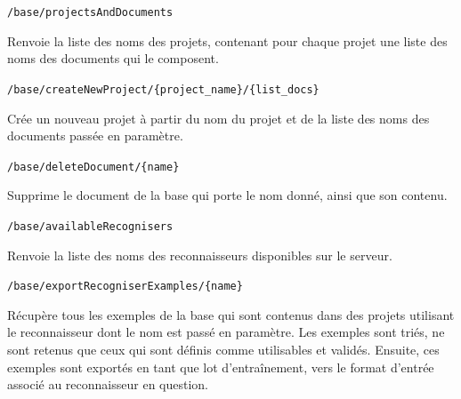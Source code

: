 \begin{description}[align=left]

\item [Général]

\item [GET] \texttt{/base/projectsAndDocuments}\newline{}
\begin{itshape}
Renvoie la liste des noms des projets, contenant pour chaque projet une liste des noms des documents qui le composent.
\end{itshape}

\item [POST] \texttt{/base/createNewProject/\{project\_name\}/\{list\_docs\}}\newline{}
\begin{itshape}
Crée un nouveau projet à partir du nom du projet et de la liste des noms des documents passée en paramètre.
\end{itshape}

\item [DELETE] \texttt{/base/deleteDocument/\{name\}}\newline{}
\begin{itshape}
Supprime le document de la base qui porte le nom donné, ainsi que son contenu.
\end{itshape}

\item [GET] \texttt{/base/availableRecognisers}\newline{}
\begin{itshape}
Renvoie la liste des noms des reconnaisseurs disponibles sur le serveur.
\end{itshape}

\item [POST] \texttt{/base/exportRecogniserExamples/\{name\}}\newline{}
\begin{itshape}
Récupère tous les exemples de la base qui sont contenus dans des projets utilisant le reconnaisseur dont le nom est passé en paramètre. Les exemples sont triés, ne sont retenus que ceux qui sont définis comme utilisables et validés. Ensuite, ces exemples sont exportés en tant que lot d'entraînement, vers le format d'entrée associé au reconnaisseur en question.
\end{itshape}

\newline{}
\item [Annotation / Validation]


\end{description}
